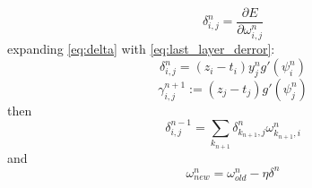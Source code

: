 \documentclass{article}
\begin{document}
%
\begin{equation} \label{eq:delta}
\delta_{i,j}^n = \frac{\partial E}{\partial \omega_{i,j}^n}
\end{equation}
%
expanding \ref{eq:delta} with \ref{eq:last_layer_derror}:
%
\begin{equation} \label{eq:delta_full}
\delta_{i,j}^n = 
\left ( z_i - t_i \right ) y_j^n g' (\psi_i^n)
\end{equation}
%
\begin{equation} \label{eq:gamma}
\gamma_{i,j}^{n+1} := (z_j - t_j) g'(\psi_j^n)
\end{equation}
%
then
%
\begin{equation} \label{eq:delta2}
\delta_{i,j}^{n-1} =
\sum_{k_{n+1}} \delta_{k_{n+1},j}^n \omega_{k_{n+1},i}^n
\end{equation}
%
and
%
\begin{equation} \label{eq:weights}
\omega_{new}^n = \omega_{old}^n - \eta \delta^n
\end{equation}
%
\end{document}
